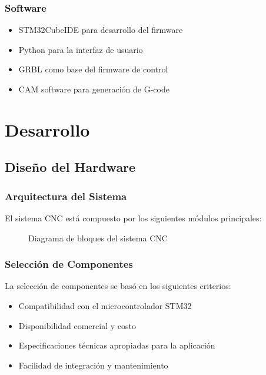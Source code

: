 \documentclass[12pt]{article}
\begin{document}
\subsubsection{Software}
\begin{itemize}
    \item STM32CubeIDE para desarrollo del firmware
    \item Python para la interfaz de usuario
    \item GRBL como base del firmware de control
    \item CAM software para generación de G-code
\end{itemize}

\section{Desarrollo}

\subsection{Diseño del Hardware}

\subsubsection{Arquitectura del Sistema}

El sistema CNC está compuesto por los siguientes módulos principales:

\begin{figure}[H]
    \centering
    \caption{Diagrama de bloques del sistema CNC}
    \label{fig:diagrama_bloques}
\end{figure}

\subsubsection{Selección de Componentes}

La selección de componentes se basó en los siguientes criterios:
\begin{itemize}
    \item Compatibilidad con el microcontrolador STM32
    \item Disponibilidad comercial y costo
    \item Especificaciones técnicas apropiadas para la aplicación
    \item Facilidad de integración y mantenimiento
\end{itemize}
\end{document}
